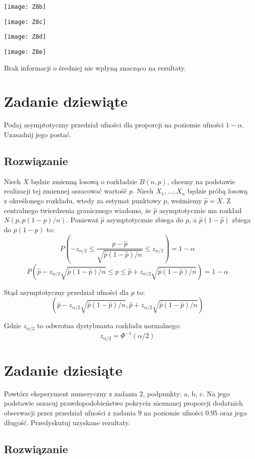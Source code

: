 \documentclass[a4paper]{article}
\begin{document}
\texttt{[image: Z8b]}

\texttt{[image: Z8c]}

\texttt{[image: Z8d]}

\texttt{[image: Z8e]}

Brak informacji o średniej nie wpłyną znacząco na rezultaty.

\section{Zadanie dziewiąte}
Podaj asymptotyczny przedział ufności dla proporcji na poziomie ufności $1-\alpha$. Uzasadnij jego postać.

\subsection{Rozwiązanie}
Niech $X$ będzie zmienną losową o rozkładzie $B(n,p)$, chcemy na podstawie realizacji tej zmiennej oszacować wartość $p$. Niech $X_1,...,X_n$ będzie próbą losową z określonego rozkładu, wtedy za estymat punktowy $p$, weźmiemy $\hat{p}=\bar{X}$. Z centralnego twierdzenia granicznego wiadomo, że $\hat{p}$ asymptotycznie ma rozkład $N(p,p(1-p)/n)$. Ponieważ $\hat{p}$ asymptotycznie zbiega do $p$, a $\hat{p}(1-\hat{p})$ zbiega do $p(1-p)$ to:
$$P(-z_{\alpha/2}\leq\frac{p-\hat{p}}{\sqrt{\hat{p}(1-\hat{p})/n}}\leq z_{\alpha/2})=1-\alpha$$
$$P(\hat{p}-z_{\alpha/2}\sqrt{\hat{p}(1-\hat{p})/n}\leq p\leq\hat{p}+z_{\alpha/2}\sqrt{\hat{p}(1-\hat{p})/n})=1-\alpha$$

Stąd asymptotyczny przedział ufności dla $p$ to:
$$(\hat{p}-z_{\alpha/2}\sqrt{\hat{p}(1-\hat{p})/n},\hat{p}+z_{\alpha/2}\sqrt{\hat{p}(1-\hat{p})/n})$$

Gdzie $z_{\alpha/2}$ to odwrotna dystybuanta rozkładu normalnego:
$$z_{\alpha/2}=\Phi^{-1}(\alpha/2)$$

\section{Zadanie dziesiąte}
Powtórz eksperyment numeryczny z zadania 2, podpunkty: a, b, c. Na jego podstawie oszacuj prawdopodobieństwo pokrycia nieznanej proporcji dodatnich obserwacji przez przedział ufności z zadania 9 na poziomie ufności 0.95 oraz jego długość. Przedyskutuj uzyskane rezultaty.

\subsection{Rozwiązanie}
\end{document}
